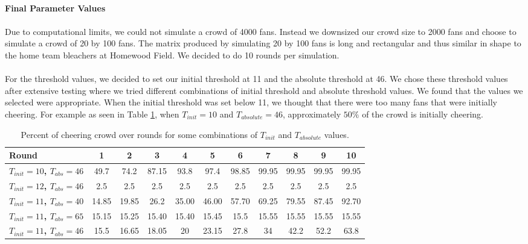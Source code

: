\documentclass[oneside,12pt]{report}
\begin{document}
\paragraph{Final Parameter Values}
\paragraph{}
Due to computational limits, we could not simulate a crowd of 4000 fans. Instead we downsized our crowd size to 2000 fans and choose to simulate a crowd of 20 by 100 fans. The matrix produced by simulating 20 by 100 fans is long and rectangular and thus similar in shape to the home team bleachers at Homewood Field. We decided to do 10 rounds per simulation. 
\paragraph{}
For the threshold values, we decided to set our initial threshold at 11 and the absolute threshold at 46. We chose these threshold values after extensive testing where we tried different combinations of initial threshold and absolute threshold values. We found that the values we selected were appropriate. When the initial threshold was set below 11, we thought that there were too many fans that were initially cheering. For example as seen in Table \ref{valuetest}, when $T_{init}=10$ and $T_{absolute}=46$, approximately $50\%$ of the crowd is initially cheering.

\begin{table}[h!]
\begin{center}
\begin{footnotesize}
\begin{tabular}{|l|c|c|c|c|c|c|c|c|c|c|}
\hline
\textbf{Round}&1&2&3&4&5&6&7&8&9&10\\\hline
\textbf{$T_{init}=10$, $T_{abs}=46$}&49.7&74.2&87.15&93.8&97.4&98.85&99.95&99.95&99.95&99.95\\\hline
\textbf{$T_{init}=12$, $T_{abs}=46$}&2.5&2.5&2.5&2.5&2.5&2.5&2.5&2.5&2.5&2.5\\\hline 
\textbf{$T_{init}=11$, $T_{abs}=40$}&14.85&19.85&26.2&35.00&46.00&57.70&69.25&79.55&87.45&92.70\\\hline
\textbf{$T_{init}=11$, $T_{abs}=65$}&15.15&15.25&15.40&15.40&15.45&15.5&15.55&15.55&15.55&15.55\\\hline
\textbf{$T_{init}=11$, $T_{abs}=46$}&15.5&16.65&18.05&20&23.15&27.8&34&42.2&52.2&63.8\\\hline
\end{tabular}
\end{footnotesize}
\end{center}
\caption{Percent of cheering crowd over rounds for some combinations of $T_{init}$ and $T_{absolute}$ values.}
\label{valuetest}
\end{table}
\end{document}
